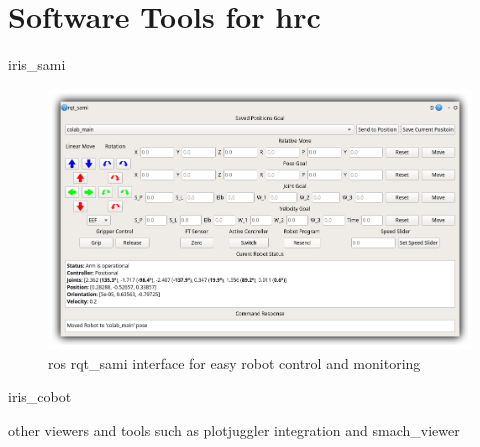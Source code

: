 \section{Software Tools for \ac{hrc}}
\label{sec:tools-hrc}


\par iris\_sami

\begin{figure}[h]
    \centering
    \includegraphics[width=0.9\linewidth]{figs/chp5/rqt_sami.png}
    \caption{\ac{ros} rqt\_sami interface for easy robot control and monitoring}
    \label{fig:rqt_sami}
\end{figure}

\par iris\_cobot

\par other viewers and tools such as plotjuggler integration and smach\_viewer
